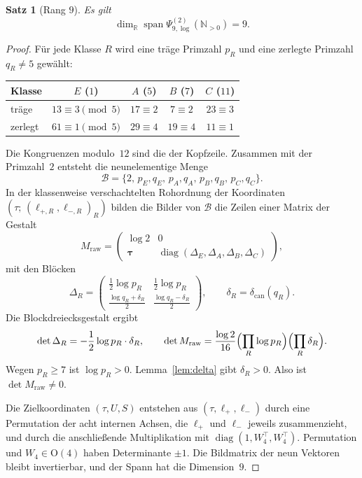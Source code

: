 \documentclass[11pt,a4paper]{article}
\theoremstyle{plain}
\newtheorem{theorem}{Satz}[section]
\theoremstyle{definition}
\newcommand{\N}{\mathbb{N}}
\newcommand{\R}{\mathbb{R}}
\DeclareMathOperator{\diag}{diag}
\numberwithin{equation}{section}
\begin{document}
\begin{theorem}[Rang $9$]
\label{thm:rang}
Es gilt
\begin{equation}
\dim_{\R}\operatorname{span}\Psi_{9,\log}^{(2)}(\N_{>0})=9.
\end{equation}
\end{theorem}

\begin{proof}
Für jede Klasse $R$ wird eine träge Primzahl $p_R$ und eine zerlegte
Primzahl $q_R\neq 5$ gewählt:
\begin{center}
\begin{tabular}{@{}lcccc@{}}
\toprule
Klasse & $E$ ($1$) & $A$ ($5$) & $B$ ($7$) & $C$ ($11$)\\
\midrule
träge & $13\equiv 3\pmod{5}$ & $17\equiv 2$ & $7\equiv 2$ & $23\equiv 3$\\
zerlegt & $61\equiv 1\pmod{5}$ & $29\equiv 4$ & $19\equiv 4$ & $11\equiv 1$\\
\bottomrule
\end{tabular}
\end{center}
Die Kongruenzen modulo~$12$ sind die der Kopfzeile.
Zusammen mit der Primzahl~$2$ entsteht die neunelementige Menge
\begin{equation}
\mathcal{B}=\{2,\,p_E,q_E,\,p_A,q_A,\,p_B,q_B,\,p_C,q_C\}.
\end{equation}
In der klassenweise verschachtelten Rohordnung der Koordinaten
$(\tau;\,(\ell_{+,R},\ell_{-,R})_{R})$ bilden die Bilder von $\mathcal{B}$ die
Zeilen einer Matrix der Gestalt
\begin{equation}
M_{\mathrm{raw}}=
\begin{pmatrix}
\log 2 & 0\\
\boldsymbol{\tau} & \diag(\Delta_E,\Delta_A,\Delta_B,\Delta_C)
\end{pmatrix},
\end{equation}
mit den Blöcken
\begin{equation}
\Delta_R=
\begin{pmatrix}
\tfrac12\log p_R & \tfrac12\log p_R\\[0.4em]
\frac{\log q_R+\delta_R}{2} & \frac{\log q_R-\delta_R}{2}
\end{pmatrix},
\qquad
\delta_R=\delta_{\mathrm{can}}(q_R).
\end{equation}
Die Blockdreiecksgestalt ergibt
\begin{equation}
\det\Delta_R
=-\frac12\log p_R\cdot\delta_R,
\qquad
\det M_{\mathrm{raw}}
=\frac{\log 2}{16}
\Bigl(\prod_R\log p_R\Bigr)
\Bigl(\prod_R\delta_R\Bigr).
\end{equation}
Wegen $p_R\ge 7$ ist $\log p_R>0$.
Lemma~\ref{lem:delta} gibt $\delta_R>0$.
Also ist $\det M_{\mathrm{raw}}\neq 0$.

Die Zielkoordinaten $(\tau,U,S)$ entstehen aus
$(\tau,\boldsymbol{\ell}_+,\boldsymbol{\ell}_-)$ durch eine Permutation der acht
internen Achsen, die $\ell_+$ und $\ell_-$ jeweils zusammenzieht, und durch die
anschließende Multiplikation mit $\diag(1,W_4^\top,W_4^\top)$.
Permutation und $W_4\in\mathrm{O}(4)$ haben Determinante $\pm 1$.
Die Bildmatrix der neun Vektoren bleibt invertierbar, und der Spann hat
die Dimension~$9$.
\end{proof}
\end{document}
